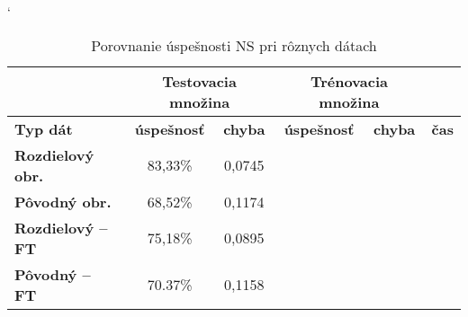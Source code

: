 





\begin{table}[h]
\catcode` %
\centering
\begin{tabular}{|l|c|c|c|c|c|}
\cline{2-5}
\multicolumn{1}{l}{} & \multicolumn{2}{|c|}{\textbf{Testovacia množina}} & \multicolumn{2}{c|}{\textbf{Trénovacia množina}} & \multicolumn{1}{l}{}\\ 
\hline
\textbf{Typ dát} & \textbf{úspešnosť} & \textbf{chyba} & \textbf{úspešnosť} & \textbf{chyba} & \textbf{čas} \\ \hline
\textbf{Rozdielový obr.} & 83,33\% & 0,0745 & & & \\ \hline
\textbf{Pôvodný obr.} & 68,52\% & 0,1174& & &\\ \hline
\textbf{Rozdielový -- FT} & 75,18\%& 0,0895& & &\\ \hline
\textbf{Pôvodný -- FT} & 70.37\%& 0,1158& & &\\
\hline
\end{tabular}
\caption{Porovnanie úspešnosti NS pri rôznych dátach}
\label{tab:neuraldatacmp}
\end{table}

\todo